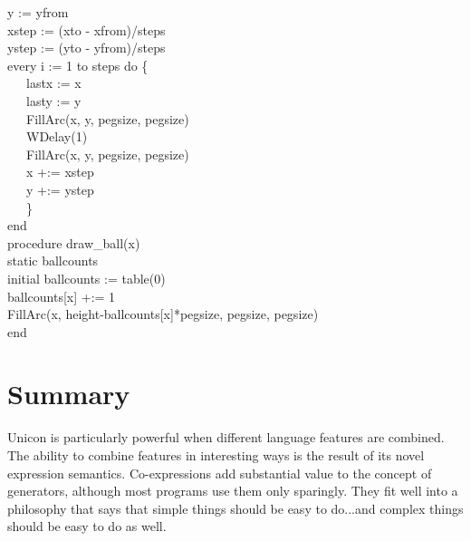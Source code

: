 {\>   y := yfrom \\
\>   xstep := (xto - xfrom)/steps \\
\>   ystep := (yto - yfrom)/steps \\
\>   every i := 1 to steps do \{ \\
\>   \ \ \ lastx := x \\
\>   \ \ \ lasty := y \\
\>   \ \ \ FillArc(x, y, pegsize, pegsize) \\
\>   \ \ \ WDelay(1) \\
\>   \ \ \ FillArc(x, y, pegsize, pegsize) \\
\>   \ \ \ x +:= xstep \\
\>   \ \ \ y +:= ystep \\
\>   \ \ \ \} \\
end
\ \\
procedure draw\_ball(x) \\
static ballcounts \\
initial ballcounts := table(0) \\
\>   ballcounts[x] +:= 1 \\
\>   FillArc(x, height-ballcounts[x]*pegsize, pegsize, pegsize) \\
end
}

\section*{Summary}

Unicon is particularly powerful when different language features are
combined. The ability to combine features in interesting ways is the
result of its novel expression semantics. Co-expressions add
substantial value to the concept of generators,
although most programs use them only sparingly. They fit well into a
philosophy that says that simple things should be easy to do...and
complex things should be easy to do as well.

